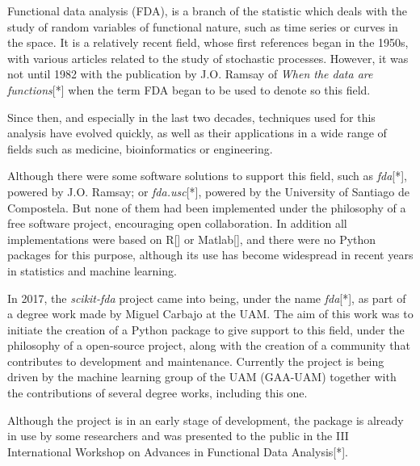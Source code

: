 

Functional data analysis (FDA), is a branch of the
statistic which deals with the study of random variables of
functional nature, such as time series or curves in the
space. It is a relatively recent field, whose first references
began in the 1950s, with various articles related to the study of stochastic
processes. However, it was not until 1982 with the publication by
J.O. Ramsay of \textit{When the data are functions}[*] when the term FDA began
to be used to denote so this field.

Since then, and especially in the last two decades, techniques used for this analysis
have evolved quickly, as well as their applications in a wide range of fields
such as medicine, bioinformatics or engineering.

Although there were some software solutions to support this field, such as
\textit{fda}[*], powered by J.O. Ramsay; or \textit{fda.usc}[*], powered by the
University of Santiago de Compostela. But none of them had been implemented
under the philosophy of a free software project, encouraging open collaboration.
In addition all implementations were based on R[] or Matlab[], and there were no
Python packages for this purpose, although its use has become widespread in
recent years in statistics and machine learning.

In 2017, the \textit{scikit-fda} project came into being,
under the name \textit{fda}[*], as part of a degree work made by Miguel Carbajo
at the UAM. The aim of this work was to initiate the creation of a
Python package to give support to this field, under the philosophy of a open-source
project, along with the creation of a community that contributes to development
and maintenance. Currently the project is being driven by the machine
learning group of the UAM (GAA-UAM) together with the contributions of several
degree works, including this one.

Although the project is in an early stage of development, the package is already
in use by some researchers and was presented to the public in the
III International Workshop on Advances in Functional Data Analysis[*].
